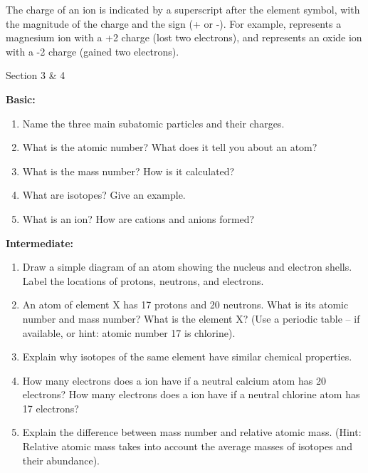 The charge of an ion is indicated by a superscript after the element symbol, with the magnitude of the charge and the sign (+ or -). For example,  represents a magnesium ion with a +2 charge (lost two electrons), and  represents an oxide ion with a -2 charge (gained two electrons).

\begin{tieredquestions}{Section 3 & 4}

\textbf{Basic:}
\begin{enumerate}
    \item Name the three main subatomic particles and their charges.
    \item What is the atomic number? What does it tell you about an atom?
    \item What is the mass number? How is it calculated?
    \item What are isotopes? Give an example.
    \item What is an ion? How are cations and anions formed?
\end{enumerate}

\textbf{Intermediate:}
\begin{enumerate}
    \item  Draw a simple diagram of an atom showing the nucleus and electron shells. Label the locations of protons, neutrons, and electrons.
    \item  An atom of element X has 17 protons and 20 neutrons. What is its atomic number and mass number? What is the element X? (Use a periodic table – if available, or hint: atomic number 17 is chlorine).
    \item Explain why isotopes of the same element have similar chemical properties.
    \item How many electrons does a  ion have if a neutral calcium atom has 20 electrons? How many electrons does a  ion have if a neutral chlorine atom has 17 electrons?
    \item Explain the difference between mass number and relative atomic mass. (Hint: Relative atomic mass takes into account the average masses of isotopes and their abundance).
\end{enumerate}


\end{tieredquestions}

